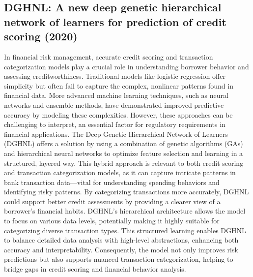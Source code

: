 \documentclass[12pt,letterpaper]{article}
\begin{document}
\subsection{DGHNL: A new deep genetic hierarchical network of learners for prediction of credit scoring (2020)}

In financial risk management, accurate credit scoring and transaction categorization models play a crucial role in understanding borrower behavior and assessing creditworthiness. Traditional models like logistic regression offer simplicity but often fail to capture the complex, nonlinear patterns found in financial data. More advanced machine learning techniques, such as neural networks and ensemble methods, have demonstrated improved predictive accuracy by modeling these complexities. However, these approaches can be challenging to interpret, an essential factor for regulatory requirements in financial applications.
The Deep Genetic Hierarchical Network of Learners (DGHNL) offers a solution by using a combination of genetic algorithms (GAs) and hierarchical neural networks to optimize feature selection and learning in a structured, layered way. This hybrid approach is relevant to both credit scoring and transaction categorization models, as it can capture intricate patterns in bank transaction data—vital for understanding spending behaviors and identifying risky patterns. By categorizing transactions more accurately, DGHNL could support better credit assessments by providing a clearer view of a borrower’s financial habits.
DGHNL’s hierarchical architecture allows the model to focus on various data levels, potentially making it highly suitable for categorizing diverse transaction types. This structured learning enables DGHNL to balance detailed data analysis with high-level abstractions, enhancing both accuracy and interpretability. Consequently, the model not only improves risk predictions but also supports nuanced transaction categorization, helping to bridge gaps in credit scoring and financial behavior analysis.

\clearpage

\makereference



\cite{plawiak2020dghnl}
\cite{radford2019gpt2}
\cite{vaswani2023attention}

\clearpage
\end{document}

